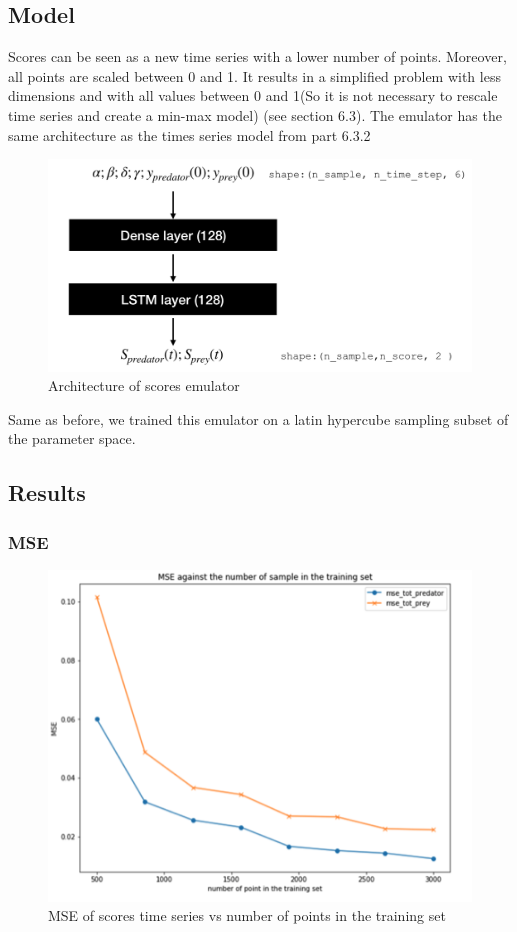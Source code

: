 \documentclass{article}
\begin{document}
\subsection{Model}
Scores can be seen as a new time series with a lower number of points. Moreover, all points are scaled between 0 and 1. It results in a simplified problem with less dimensions and with all values between 0 and 1(So it is not necessary to rescale time series and create a min-max model) (see section 6.3). The emulator has the same architecture as the times series model from part 6.3.2 

\begin{figure}[H]
\centering
\includegraphics[scale=0.4]{image/scores_archite.png}
\caption{Architecture of scores emulator}
\label{fig: scores emulator}
\end{figure}

Same as before, we trained this emulator on a latin hypercube sampling subset of the parameter space. 

\subsection{Results}

\subsubsection{MSE}
\begin{figure}[H]
\centering
\includegraphics[scale=0.5]{image/MSE_score.png}
\caption{MSE of scores time series vs number of points in the training set}
\label{fig: scores MSE}
\end{figure}
\end{document}
